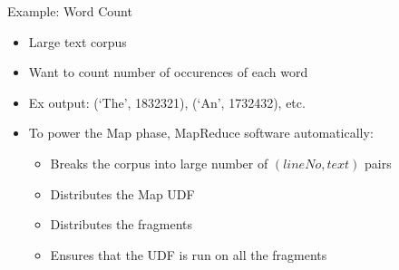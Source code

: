 \documentclass[aspectratio=169]{beamer}
\begin{document}
\begin{frame}{Example: Word Count}

\begin{itemize}
\item Large text corpus
\item Want to count number of occurences of each word
\item Ex output: (`The', 1832321), (`An', 1732432), etc.
\item To power the Map phase, MapReduce software automatically:
        \begin{itemize}
\item  Breaks the corpus into large number of $(lineNo, text)$ pairs
\item Distributes the Map UDF
\item Distributes the fragments
\item Ensures that the UDF is run on all the fragments
        \end{itemize}
\end{itemize}

\end{frame}
\end{document}
